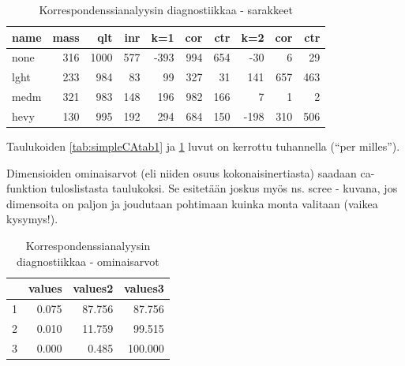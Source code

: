 \documentclass[finnish,]{book}
\newenvironment{Shaded}{\begin{snugshade}}{\end{snugshade}}
\newcommand{\DataTypeTok}[1]{\textcolor[rgb]{0.13,0.29,0.53}{#1}}
\newcommand{\DecValTok}[1]{\textcolor[rgb]{0.00,0.00,0.81}{#1}}
\newcommand{\KeywordTok}[1]{\textcolor[rgb]{0.13,0.29,0.53}{\textbf{#1}}}
\newcommand{\NormalTok}[1]{#1}
\newcommand{\OperatorTok}[1]{\textcolor[rgb]{0.81,0.36,0.00}{\textbf{#1}}}
\newcommand{\OtherTok}[1]{\textcolor[rgb]{0.56,0.35,0.01}{#1}}
\newcommand{\StringTok}[1]{\textcolor[rgb]{0.31,0.60,0.02}{#1}}
\begin{document}
\begin{table}[t]

\caption{\label{tab:simpleCAtab2}Korrespondenssianalyysin diagnostiikkaa - sarakkeet}
\centering
\begin{tabular}{lrrrrrrrrr}
\toprule
name & mass &  qlt &  inr &  k=1 & cor & ctr &  k=2 & cor & ctr\\
\midrule
none & 316 & 1000 & 577 & -393 & 994 & 654 & -30 & 6 & 29\\
lght & 233 & 984 & 83 & 99 & 327 & 31 & 141 & 657 & 463\\
medm & 321 & 983 & 148 & 196 & 982 & 166 & 7 & 1 & 2\\
hevy & 130 & 995 & 192 & 294 & 684 & 150 & -198 & 310 & 506\\
\bottomrule
\end{tabular}
\end{table}

Taulukoiden \ref{tab:simpleCAtab1} ja \ref{tab:simpleCAtab2} luvut on kerrottu tuhannella (``per milles'').

Dimensioiden ominaisarvot (eli niiden osuus kokonaisinertiasta) saadaan ca-funktion tuloslistasta taulukoksi. Se esitetään joskus myös ns. scree - kuvana, jos dimensoita on paljon ja joudutaan pohtimaan kuinka monta valitaan (vaikea kysymys!).

\begin{Shaded}
\end{Shaded}

\begin{table}[t]

\caption{\label{tab:simpleCAscree}Korrespondenssianalyysin diagnostiikkaa - ominaisarvot}
\centering
\begin{tabular}{rrrr}
\toprule
 & values & values2 & values3\\
\midrule
1 & 0.075 & 87.756 & 87.756\\
2 & 0.010 & 11.759 & 99.515\\
3 & 0.000 & 0.485 & 100.000\\
\bottomrule
\end{tabular}
\end{table}
\end{document}
